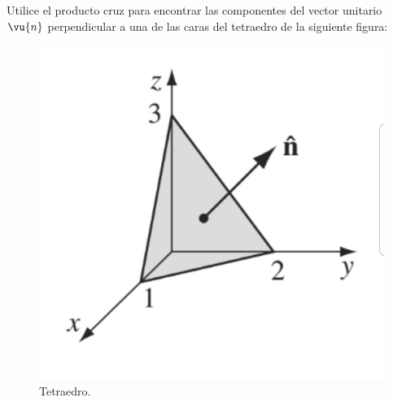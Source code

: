 \begin{mdframed}[style=warning]
	\begin{ejercicio}
		\begin{multicols}{2}
		Utilice el producto cruz para encontrar las componentes del vector unitario $\vu{n}$ perpendicular a una de las caras del tetraedro de la siguiente figura:
		\columnbreak
		\begin{figure}[H]
			\centering
			\includegraphics[scale=0.07]{./img/tetraedro.jpeg}
			\caption{Tetraedro.}
			\label{tetraedro}
		\end{figure}
		\end{multicols}
	\end{ejercicio}
\end{mdframed}

















































